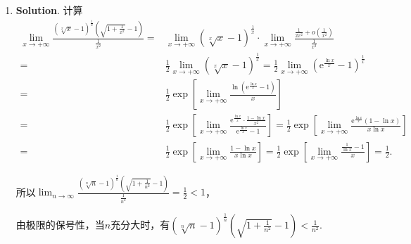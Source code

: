 \documentclass[../Main.tex]{subfiles}
\begin{document}
\begin{enumerate}
    \item \textbf{Solution}. 计算
          \[
              \begin{aligned}
                  \lim_{x\to+\infty}\frac{\left(\sqrt[x]{x}-1\right)^{\frac{1}{x}}\left(\sqrt{1+\frac{1}{x^2}}-1\right)}{\frac{1}{x^2}}= & \lim_{x\to+\infty}\left(\sqrt[x]{x}-1\right)^{\frac{1}{x}}\cdot\lim_{x\to+\infty}\frac{\frac{1}{2x^2}+o\left(\frac{1}{x^2}\right)}{\frac{1}{x^2}}                                                                                              \\
                  =                                                                                                                      & \frac{1}{2}\lim_{x\to+\infty}\left(\sqrt[x]{x}-1\right)^{\frac{1}{x}}=\frac{1}{2}\lim_{x\to+\infty}\left(\mathrm{e}^{\frac{\ln x}{x}}-1\right)^{\frac{1}{x}}                                                                                   \\
                  =                                                                                                                      & \frac{1}{2}\exp\left[\lim_{x\to+\infty}\frac{\ln\left(\mathrm{e}^{\frac{\ln x}{x}}-1\right)}{x}\right]                                                                                                                                         \\
                  =                                                                                                                      & \frac{1}{2}\exp\left[\lim_{x\to+\infty}\frac{\mathrm{e}^{\frac{\ln x}{x}}\cdot\frac{1-\ln x}{x^2}}{\mathrm{e}^{\frac{\ln x}{x}}-1}\right] = \frac{1}{2}\exp\left[\lim_{x\to+\infty}\frac{\mathrm{e}^{\frac{\ln x}{x}}(1-\ln x)}{x\ln x}\right] \\
                  =                                                                                                                      & \frac{1}{2}\exp\left[\lim_{x\to+\infty}\frac{1-\ln x}{x\ln x}\right] = \frac{1}{2}\exp\left[\lim_{x\to+\infty}\frac{\frac{1}{\ln x}-1}{x}\right]=\frac{1}{2}.
              \end{aligned}
          \]

          所以$\lim_{n\to\infty}\frac{\left(\sqrt[n]{n}-1\right)^{\frac{1}{n}}\left(\sqrt{1+\frac{1}{n^2}}-1\right)}{\frac{1}{n^{2}}}
              =\frac{1}{2}<1$，

          由极限的保号性，当$n$充分大时，有$\left(\sqrt[n]{n}-1\right)^{\frac{1}{n}}\left
              (\sqrt{1+\frac{1}{n^{2}}}-1\right)<\frac{1}{n^{2}}$.


\end{enumerate}
\end{document}
